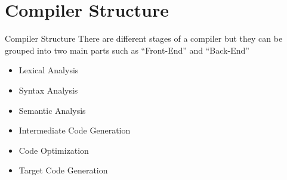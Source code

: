 \section{Compiler Structure} %


\begin{frame}{Compiler Structure}
There are different stages of a compiler but they can be grouped into two main parts
such as “Front-End” and “Back-End”
	\begin {itemize}
	    \item Lexical Analysis
	    \item Syntax Analysis
	    \item Semantic Analysis
	    \item Intermediate Code Generation
	    \item Code Optimization
	    \item Target Code Generation	    
	\end {itemize}	
\end{frame}

